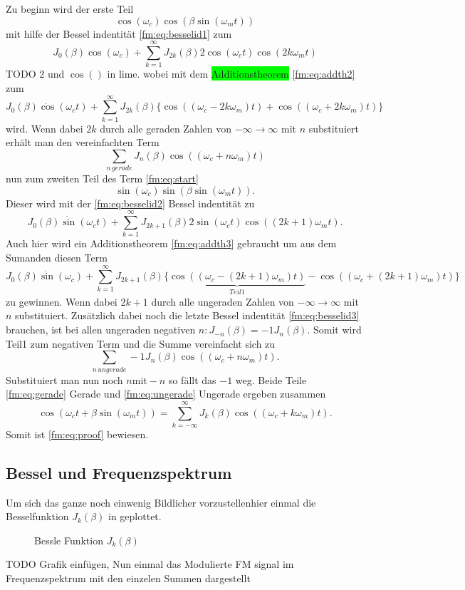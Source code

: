 Zu beginn wird der erste Teil 
\[
    \cos(\omega_c)\cos(\beta\sin(\omega_mt))  
\]
mit hilfe der Bessel indentität \ref{fm:eq:besselid1} zum
\[
    J_0(\beta)\cos(\omega_c) + \sum_{k=1}^\infty J_{2k}(\beta) 2\cos(\omega_c t)\cos(2k\omega_m t)
\]
\newline
TODO 2 und \(\cos( )\) in lime.
wobei mit dem \colorbox{lime}{Additionstheorem} \ref{fm:eq:addth2} zum
\[
    J_0(\beta)\dot \cos(\omega_c t) + \sum_{k=1}^\infty J_{2k}(\beta) \{ \cos((\omega_c - 2k\omega_m) t)+\cos((\omega_c + 2k\omega_m) t) \}
\]
wird.
Wenn dabei \(2k\) durch alle geraden Zahlen von \(-\infty \to \infty\) mit \(n\) substituiert erhält man den vereinfachten Term
\[
    \sum_{n\, gerade} J_{n}(\beta) \cos((\omega_c + n\omega_m) t)
    \label{fm:eq:gerade}
\]
\newline
nun zum zweiten Teil des Term \ref{fm:eq:start} 
\[
    \sin(\omega_c)\sin(\beta\sin(\omega_m t)).
\]
Dieser wird mit der \ref{fm:eq:besselid2} Bessel indentität zu
\[
    J_0(\beta) \dot \sin(\omega_c t) + \sum_{k=1}^\infty J_{2k+1}(\beta) 2\sin(\omega_c t)\cos((2k+1)\omega_m t).
\]
Auch hier wird ein Additionstheorem \ref{fm:eq:addth3} gebraucht um aus dem Sumanden diesen Term 
\[
    J_0(\beta) \dot \sin(\omega_c) + \sum_{k=1}^\infty J_{2k+1}(\beta) \{ \underbrace{\cos((\omega_c-(2k+1)\omega_m) t)}_{Teil1} - \cos((\omega_c+(2k+1)\omega_m) t) \}
\]zu gewinnen.
Wenn dabei \(2k +1\) durch alle ungeraden Zahlen von \(-\infty \to \infty\) mit \(n\) substituiert.
Zusätzlich dabei noch die letzte Bessel indentität \ref{fm:eq:besselid3} brauchen, ist bei allen ungeraden negativen \(n : J_{-n}(\beta) = -1 J_n(\beta)\).
Somit wird Teil1 zum negativen Term und die Summe vereinfacht sich zu
\[
     \sum_{n\, ungerade} -1 J_{n}(\beta) \cos((\omega_c + n\omega_m) t).
     \label{fm:eq:ungerade}
\]
Substituiert man nun noch \(n \text{mit} -n \) so fällt das \(-1\) weg.
Beide Teile \ref{fm:eq:gerade} Gerade und \ref{fm:eq:ungerade} Ungerade ergeben zusammen
\[
    \cos(\omega_ct+\beta\sin(\omega_mt))
    =
    \sum_{k= -\infty}^\infty J_{k}(\beta) \cos((\omega_c+k\omega_m)t).
\]
Somit ist \ref{fm:eq:proof} bewiesen.
\newpage
\subsection{Bessel und Frequenzspektrum}
Um sich das ganze noch einwenig Bildlicher vorzustellenhier einmal die Besselfunktion \(J_{k}(\beta)\) in geplottet.
\begin{figure}
	\centering
	\caption{Bessle Funktion \(J_{k}(\beta)\)}
	\label{fig:bessel}
\end{figure}
TODO Grafik einfügen,
\newline
Nun einmal das Modulierte FM signal im Frequenzspektrum mit den einzelen Summen dargestellt

